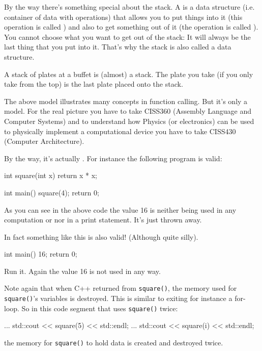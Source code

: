 By the way there's something special about the stack. A  is a data structure (i.e. container of data with operations) that allows you to put things into it (this operation is called ) and also to get something out of it (the operation is called ). You cannot choose what you want to get out of the stack: It will always be the last thing that you put into it. That's why the stack is also called a   data structure.

A stack of plates at a buffet is (almost) a stack. The plate you take (if you only take from the top) is the last plate placed onto the stack.

The above model illustrates many concepts in function calling. But it's only a model. For the real picture you have to take CISS360 (Assembly Language and Computer Systems) and to understand how Physics (or electronics) can be used to physically implement a computational device you have to take CISS430 (Computer Architecture).

By the way, it's actually . For instance the following program is valid:

\begin{consolethree}[escapeinside=||]
int square(int x)
{
    return x * x;
}

int main()
{
    square(4);
    return 0;
}
\end{consolethree}

As you can see in the above code the value 16 is neither being used in any computation or nor in a print statement. It's just thrown away.

In fact something like this is also valid! (Although quite silly).

\begin{consolethree}[escapeinside=||]
int main()
{
    16;
    return 0;
}
\end{consolethree}

Run it. Again the value 16 is not used in any way.

Note again that when C++ returned from \texttt{square()}, the memory used for \texttt{square()}'s variables is destroyed. This is similar to exiting for instance a for-loop. So in this code segment that uses \texttt{square()} twice:

\begin{consolethree}[escapeinside=||]
...
std::cout << square(5) << std::endl;
...
std::cout << square(i) << std::endl;
\end{consolethree}

the memory for \texttt{square()} to hold data is created and destroyed twice.





